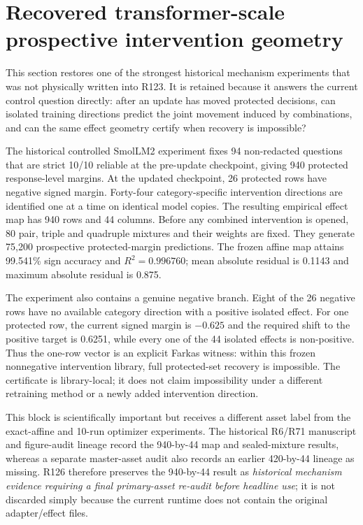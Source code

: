 \documentclass[11pt,letterpaper]{article}
\theoremstyle{plain}
\newcommand{\1}{\mathbf 1}
\begin{document}
\clearpage
\section{Recovered transformer-scale prospective intervention geometry}
This section restores one of the strongest historical mechanism experiments that was not physically written into R123. It is retained because it answers the current control question directly: after an update has moved protected decisions, can isolated training directions predict the joint movement induced by combinations, and can the same effect geometry certify when recovery is impossible?

The historical controlled SmolLM2 experiment fixes 94 non-redacted questions that are strict 10/10 reliable at the pre-update checkpoint, giving 940 protected response-level margins. At the updated checkpoint, 26 protected rows have negative signed margin. Forty-four category-specific intervention directions are identified one at a time on identical model copies. The resulting empirical effect map has 940 rows and 44 columns. Before any combined intervention is opened, 80 pair, triple and quadruple mixtures and their weights are fixed. They generate 75,200 prospective protected-margin predictions. The frozen affine map attains 99.541\% sign accuracy and $R^2=0.996760$; mean absolute residual is 0.1143 and maximum absolute residual is 0.875.

The experiment also contains a genuine negative branch. Eight of the 26 negative rows have no available category direction with a positive isolated effect. For one protected row, the current signed margin is $-0.625$ and the required shift to the positive target is 0.6251, while every one of the 44 isolated effects is non-positive. Thus the one-row vector is an explicit Farkas witness: within this frozen nonnegative intervention library, full protected-set recovery is impossible. The certificate is library-local; it does not claim impossibility under a different retraining method or a newly added intervention direction.

This block is scientifically important but receives a different asset label from the exact-affine and 10-run optimizer experiments. The historical R6/R71 manuscript and figure-audit lineage record the 940-by-44 map and sealed-mixture results, whereas a separate master-asset audit also records an earlier 420-by-44 lineage as missing. R126 therefore preserves the 940-by-44 result as \emph{historical mechanism evidence requiring a final primary-asset re-audit before headline use}; it is not discarded simply because the current runtime does not contain the original adapter/effect files.
\end{document}
